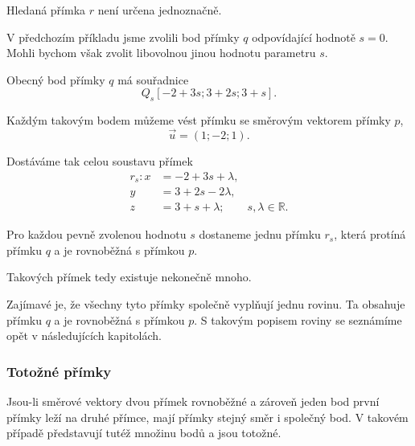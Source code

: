 \begin{remark}
    Hledaná přímka $r$ není určena jednoznačně.

    V předchozím příkladu jsme zvolili bod přímky $q$ odpovídající
    hodnotě $s=0$. Mohli bychom však zvolit libovolnou jinou hodnotu
    parametru $s$.

    Obecný bod přímky $q$ má souřadnice
    \[
        Q_s[-2+3s;3+2s;3+s].
    \]

    Každým takovým bodem můžeme vést přímku se směrovým vektorem
    přímky $p$,
    \[
        \vec{u}=(1;-2;1).
    \]

    Dostáváme tak celou soustavu přímek
    \[
        \begin{aligned}
            r_s: x&=-2+3s+\lambda,\\
            y&=3+2s-2\lambda,\\
            z&=3+s+\lambda;
            \qquad s,\lambda\in\mathbb{R}.
        \end{aligned}
    \]

    Pro každou pevně zvolenou hodnotu $s$ dostaneme jednu přímku
    $r_s$, která protíná přímku $q$ a je rovnoběžná s přímkou $p$.

    Takových přímek tedy existuje nekonečně mnoho.

    Zajímavé je, že všechny tyto přímky společně vyplňují jednu
    rovinu. Ta obsahuje přímku $q$ a je rovnoběžná s přímkou $p$.
    S takovým popisem roviny se seznámíme opět v následujících kapitolách.
\end{remark}


\subsubsection{Totožné přímky}
\label{subsubsec:Coincident_parametric_lines_space}

Jsou-li směrové vektory dvou přímek rovnoběžné a zároveň jeden bod
první přímky leží na druhé přímce, mají přímky stejný směr i společný
bod. V takovém případě představují tutéž množinu bodů a jsou totožné.

